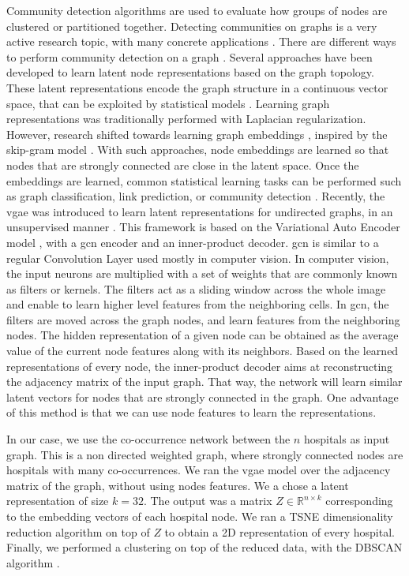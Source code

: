 Community detection algorithms are used to evaluate how groups of nodes are
clustered or partitioned together. Detecting communities on graphs is a very
active research topic, with many concrete applications
\cite{fortunato_community_2010}. There are different ways to perform community
detection on a graph \cite{hamilton_representation_2018}. Several approaches
have been developed to learn latent node representations based on the graph
topology. These latent representations encode the graph structure in a
continuous vector space, that can be exploited by statistical models
\cite{perozzi_deepwalk_2014}. Learning graph representations was traditionally
performed with Laplacian regularization. However, research shifted towards
learning graph embeddings \cite{kipf_semi-supervised_2017}, inspired by the
skip-gram model \cite{mikolov_distributed_2013}. With such approaches, node
embeddings are learned so that nodes that are strongly connected are close in
the latent space. Once the embeddings are learned, common statistical learning
tasks can be performed such as graph classification, link prediction, or
community detection \cite{hamilton_representation_2018}. Recently, the \ac{vgae}
was introduced to learn latent representations for undirected graphs, in an
unsupervised manner \cite{kipf_variational_2016}. This framework is based on the
Variational Auto Encoder model \cite{kingma_auto-encoding_2014}, with a \ac{gcn}
\cite{kipf_semi-supervised_2017} encoder and an inner-product decoder. \ac{gcn}
is similar to a regular Convolution Layer used mostly in computer vision. In
computer vision, the input neurons are multiplied with a set of weights that are
commonly known as filters or kernels. The filters act as a sliding window across
the whole image and enable to learn higher level features from the neighboring
cells. In \ac{gcn}, the filters are moved across the graph nodes, and learn
features from the neighboring nodes. The hidden representation of a given node
can be obtained as the average value of the current node features along with its
neighbors. Based on the learned representations of every node, the inner-product
decoder aims at reconstructing the adjacency matrix of the input graph. That
way, the network will learn similar latent vectors for nodes that are strongly
connected in the graph. One advantage of this method is that we can use node
features to learn the representations.

In our case, we use the co-occurrence network between the $n$ hospitals as input
graph. This is a non directed weighted graph, where strongly connected nodes are
hospitals with many co-occurrences. We ran the \ac{vgae} model over the
adjacency matrix of the graph, without using nodes features. We a chose a latent
representation  of size $k=32$. The output was a matrix
$Z \in \mathbb{R}^{n \times k }$ corresponding to the embedding vectors
of each hospital node. We ran a TSNE \cite{van_der_maaten_viualizing_2008}
dimensionality reduction algorithm on top of $Z$ to obtain a 2D
representation of every hospital. Finally, we performed a clustering on top of
the reduced data, with the DBSCAN algorithm \cite{ester_density-based_1996}.

